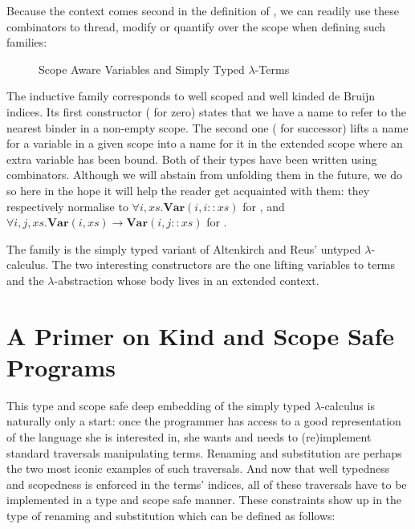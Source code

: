 Because the context comes second in the definition of , we
can readily use these combinators to thread, modify or quantify over the
scope when defining such families:

\begin{figure}[h]
\begin{minipage}{0.45\textwidth}
\end{minipage}
\begin{minipage}{0.45\textwidth}
\end{minipage}
\caption{Scope Aware Variables and Simply Typed $\lambda$-Terms\label{scoped-untyped}}
\end{figure}

The inductive family  corresponds to well scoped and well kinded
de Bruijn~\citeyear{de1972lambda}
indices. Its first constructor ( for zero) states that we have a name to refer to
the nearest binder in a non-empty scope. The second one ( for successor) lifts a
name for a variable in a given scope into a name for it in the extended scope where
an extra variable has been bound. Both of their types have been written using combinators.
Although we will abstain from unfolding them in the future, we do so here in the hope
it will help the reader get acquainted with them: they respectively normalise to
$\forall i, xs. \mathbf{Var}(i, i :: \mathit{xs})$ for ,
and $\forall i, j, xs. \mathbf{Var}(i, \mathit{xs}) \rightarrow \mathbf{Var}(i, j :: \mathit{xs})$ for .

The   family  is the simply typed variant of Altenkirch
and Reus' untyped $\lambda$-calculus. The two interesting constructors are the one
lifting variables to terms and the $\lambda$-abstraction whose body lives in an
extended context.




\section{A Primer on Kind and Scope Safe Programs}\label{section:primer-program}

This type and scope safe deep embedding of the simply typed $\lambda$-calculus is
naturally only a start: once the programmer has access to a good
representation of the language she is interested in, she wants and
needs to (re)implement standard traversals manipulating terms.
Renaming and substitution are perhaps the two most iconic examples
of such traversals. And now that well typedness and scopedness is enforced in
the terms' indices, all of these traversals have to be implemented
in a type and scope safe manner. These constraints show up in the type of
renaming and substitution which can be defined as follows:


